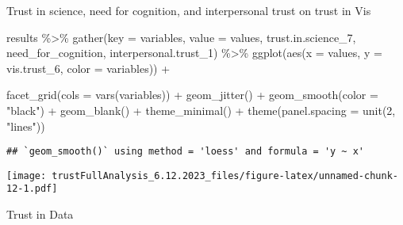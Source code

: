 \documentclass[
]{article}
\newenvironment{Shaded}{\begin{snugshade}}{\end{snugshade}}
\newcommand{\AttributeTok}[1]{\textcolor[rgb]{0.77,0.63,0.00}{#1}}
\newcommand{\DecValTok}[1]{\textcolor[rgb]{0.00,0.00,0.81}{#1}}
\newcommand{\FunctionTok}[1]{\textcolor[rgb]{0.00,0.00,0.00}{#1}}
\newcommand{\NormalTok}[1]{#1}
\newcommand{\SpecialCharTok}[1]{\textcolor[rgb]{0.00,0.00,0.00}{#1}}
\newcommand{\StringTok}[1]{\textcolor[rgb]{0.31,0.60,0.02}{#1}}
\begin{document}
Trust in science, need for cognition, and interpersonal trust on trust
in Vis

\begin{Shaded}
\begin{Highlighting}[]
\NormalTok{results }\SpecialCharTok{\%\textgreater{}\%}
  \FunctionTok{gather}\NormalTok{(}\AttributeTok{key =}\NormalTok{ variables, }\AttributeTok{value =}\NormalTok{ values, }
\NormalTok{         trust.in.science\_7, need\_for\_cognition, interpersonal.trust\_1) }\SpecialCharTok{\%\textgreater{}\%}
  \FunctionTok{ggplot}\NormalTok{(}\FunctionTok{aes}\NormalTok{(}\AttributeTok{x =}\NormalTok{ values, }\AttributeTok{y =}\NormalTok{ vis.trust\_6, }\AttributeTok{color =}\NormalTok{ variables)) }\SpecialCharTok{+}

  \FunctionTok{facet\_grid}\NormalTok{(}\AttributeTok{cols =} \FunctionTok{vars}\NormalTok{(variables)) }\SpecialCharTok{+}
    \FunctionTok{geom\_jitter}\NormalTok{() }\SpecialCharTok{+}
  \FunctionTok{geom\_smooth}\NormalTok{(}\AttributeTok{color =} \StringTok{"black"}\NormalTok{) }\SpecialCharTok{+}
  \FunctionTok{geom\_blank}\NormalTok{() }\SpecialCharTok{+} 
   \FunctionTok{theme\_minimal}\NormalTok{() }\SpecialCharTok{+}
  \FunctionTok{theme}\NormalTok{(}\AttributeTok{panel.spacing =} \FunctionTok{unit}\NormalTok{(}\DecValTok{2}\NormalTok{, }\StringTok{"lines"}\NormalTok{))}
\end{Highlighting}
\end{Shaded}

\begin{verbatim}
## `geom_smooth()` using method = 'loess' and formula = 'y ~ x'
\end{verbatim}

\texttt{[image: trustFullAnalysis\_6.12.2023\_files/figure-latex/unnamed-chunk-12-1.pdf]}

Trust in Data
\end{document}
